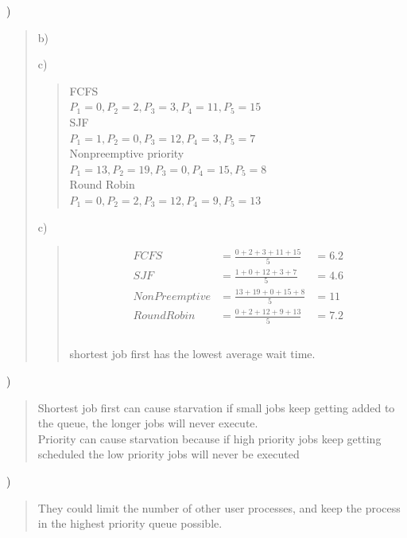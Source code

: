 \documentclass[11pt]{article}
\newenvironment{subquestion}[1]{#1) \begin{quote}}{\end{quote}}
\begin{document}
\begin{subquestion}{6.16}
\begin{subquestion}{b}
    \end{subquestion}
    \begin{subquestion}{c}
      \begin{center}
        FCFS\\
        $P_1 = 0, P_2 = 2, P_3 = 3, P_4 = 11, P_5 = 15$\\
        SJF\\
        $P_1 = 1, P_2 = 0, P_3 = 12, P_4 = 3, P_5 = 7$\\
        Nonpreemptive priority\\
        $P_1 = 13, P_2 = 19, P_3 = 0, P_4 = 15, P_5 = 8$\\
        Round Robin\\
        $P_1 = 0, P_2 = 2, P_3 = 12, P_4 = 9, P_5 = 13$\\
      \end{center}
    \end{subquestion}
    \begin{subquestion}{c}
      \begin{align*}
        FCFS &= \frac{0+2+3+11+15}{5} &= 6.2\\
        SJF &= \frac{1+0+12+3+7}{5} &= 4.6\\
        NonPreemptive &= \frac{13+19+0+15+8}{5} &= 11\\
        Round Robin &= \frac{0+2+12+9+13}{5} &= 7.2\\
      \end{align*}\\
      shortest job first has the lowest average wait time.
    \end{subquestion}
  \end{subquestion}

  \clearpage

  \begin{subquestion}{6.19}
    Shortest job first can cause starvation if small jobs keep getting added to the queue, the longer jobs will
    never execute.\\
    Priority can cause starvation because if high priority jobs keep getting scheduled the low priority jobs will never be executed
  \end{subquestion}

  \begin{subquestion}{6.22}
    They could limit the number of other user processes, and keep the process in the highest priority queue possible.
  \end{subquestion}
\end{document}
